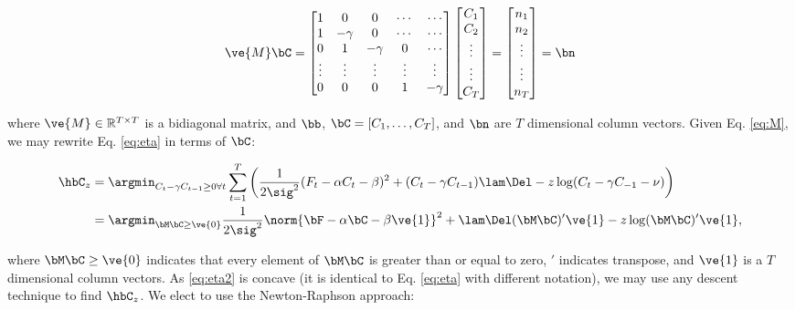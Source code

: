 \documentclass[12pt]{article}
\newcommand{\zzz}{z}
\newcommand{\az}{\argmin_{\bM \bC \geq \ve{0}}}
\begin{document}
\begin{align} \label{eq:M}
\ve{M} \bC = %
\begin{bmatrix}
1 & 0  & 0 & \cdots & \cdots \\
1 & -\gamma & 0 & \cdots & \cdots \\
0 & 1 & -\gamma & 0 & \cdots  \\
\vdots & \vdots & \vdots & \vdots & \vdots  \\
0 & 0 & 0 & 1 & -\gamma
\end{bmatrix}
\begin{bmatrix}
C_1 \\ C_2 \\ \vdots \\ \vdots \\ C_T  
\end{bmatrix}
= 
\begin{bmatrix}
n_1 \\ n_2 \\ \vdots \\ \vdots \\ n_T
\end{bmatrix}
= \bn
\end{align}

\noindent where $\ve{M} \in \mathbb{R}^{T \times T}$ is a bidiagonal matrix,  and $\bb$, $\bC=[C_1,\ldots, C_T]$, and $\bn$ are $T$ dimensional column vectors. Given Eq. \eqref{eq:M}, we may rewrite Eq. \eqref{eq:eta} in terms of $\bC$:

\begin{align} 
\hbC_{\zzz} &= \argmin_{C_t - \gamma C_{t-1} \geq 0 \forall t} \sum_{t=1}^{T} \left( \frac{1}{2 \sig^2}(F_t - \alpha C_t - \beta)^2  + (C_t - \gamma C_{t-1}) \lam \Del - \zzz \log(C_t - \gamma C_{-1} -\nu ) \right) \nonumber \\
&= \az  \frac{1}{2 \sig^2} \norm{\bF - \alpha \bC -\beta \ve{1} }^2 + \lam \Del (\bM \bC )' \ve{1}  - \zzz \log(\bM \bC)'\ve{1},  \label{eq:eta2}
\end{align}

\noindent where $\bM \bC \geq \ve{0}$ indicates that every element of $\bM \bC$ is greater than or equal to zero, $'$ indicates transpose, and  $\ve{1}$ is a $T$ dimensional column vectors. As \eqref{eq:eta2} is concave (it is identical to Eq. \eqref{eq:eta} with different notation), we may use any descent technique to find $\hbC_{\zzz}$.  We elect to use the Newton-Raphson approach: 
\end{document}
